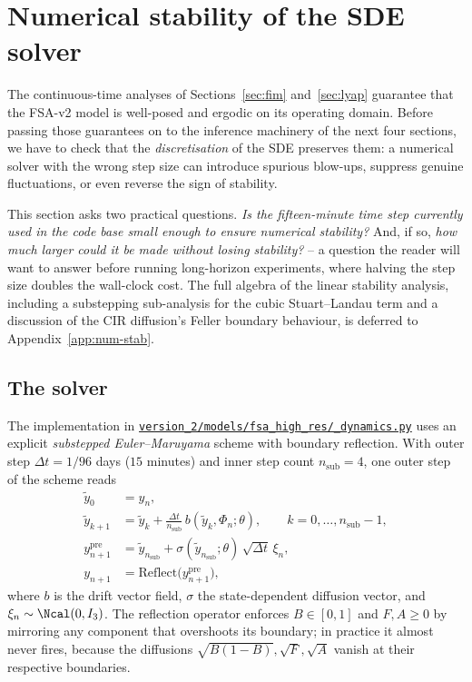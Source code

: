 \section{Numerical stability of the SDE solver}\label{sec:num-stab}

The continuous-time analyses of Sections~\ref{sec:fim} and~\ref{sec:lyap}
guarantee that the FSA-v2 model is well-posed and ergodic on its
operating domain. Before passing those guarantees on to the inference
machinery of the next four sections, we have to check that the
\emph{discretisation} of the SDE preserves them: a numerical solver
with the wrong step size can introduce spurious blow-ups, suppress
genuine fluctuations, or even reverse the sign of stability.

This section asks two practical questions. \emph{Is the
fifteen-minute time step currently used in the code base small
enough to ensure numerical stability?} And, if so, \emph{how much
larger could it be made without losing stability?} -- a question the
reader will want to answer before running long-horizon experiments,
where halving the step size doubles the wall-clock cost. The full
algebra of the linear stability analysis, including a substepping
sub-analysis for the cubic Stuart--Landau term and a discussion of
the CIR diffusion's Feller boundary behaviour, is deferred to
Appendix~\ref{app:num-stab}.

\subsection{The solver}\label{sec:num-stab-solver}

The implementation in
\href{run:../version_2/models/fsa_high_res/_dynamics.py}{\texttt{version\_2/models/fsa\_high\_res/\_dynamics.py}}
uses an explicit \emph{substepped Euler--Maruyama} scheme with
boundary reflection. With outer step $\Delta t = 1/96$ days
($15$ minutes) and inner step count $n_{\mathrm{sub}} = 4$, one
outer step of the scheme reads
\begin{align}
  \tilde y_0 &= y_n, \nonumber \\
  \tilde y_{k+1} &= \tilde y_k + \frac{\Delta t}{n_{\mathrm{sub}}}\,b(\tilde y_k,\Phi_n;\theta),
   \qquad k = 0,\dots,n_{\mathrm{sub}}-1, \label{eq:em-substep} \\
  y_{n+1}^{\mathrm{pre}} &= \tilde y_{n_{\mathrm{sub}}} + \sigma(\tilde y_{n_{\mathrm{sub}}};\theta)\,\sqrt{\Delta t}\,\xi_n, \nonumber \\
  y_{n+1} &= \mathrm{Reflect}\bigl(y_{n+1}^{\mathrm{pre}}\bigr), \nonumber
\end{align}
where $b$ is the drift vector field, $\sigma$ the state-dependent
diffusion vector, and $\xi_n \sim \Ncal(0,I_3)$. The reflection
operator enforces $B \in [0,1]$ and $F,A \ge 0$ by mirroring any
component that overshoots its boundary; in practice it almost never
fires, because the diffusions
$\sqrt{B(1-B)},\sqrt F,\sqrt A$ vanish at their respective
boundaries.

